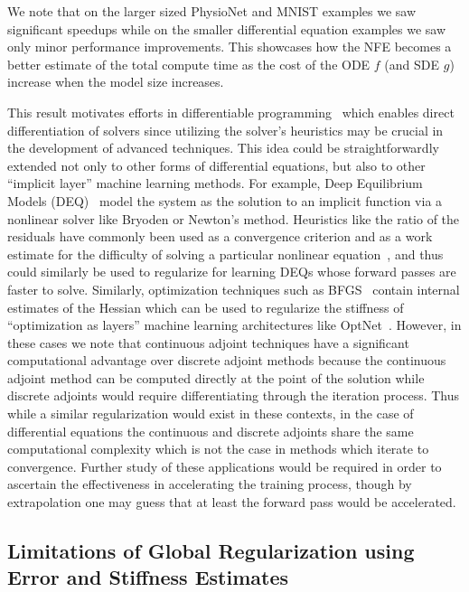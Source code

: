 We note that on the larger sized PhysioNet and MNIST examples we saw significant speedups while on the smaller differential equation examples we saw only minor performance improvements. This showcases how the NFE becomes a better estimate of the total compute time as the cost of the ODE $f$ (and SDE $g$) increase when the model size increases.

This result motivates efforts in differentiable programming~\citep{wang2018backpropagation, abadi2019simple, rackauckas2020generalized} which enables direct differentiation of solvers since utilizing the solver's heuristics may be crucial in the development of advanced techniques. This idea could be straightforwardly extended not only to other forms of differential equations, but also to other ``implicit layer'' machine learning methods. For example, Deep Equilibrium Models (DEQ)~\citep{bai_deep_2019} model the system as the solution to an implicit function via a nonlinear solver like Bryoden or Newton's method. Heuristics like the ratio of the residuals have commonly been used as a convergence criterion and as a work estimate for the difficulty of solving a particular nonlinear equation~\citep{wanner1996solving}, and thus could similarly be used to regularize for learning DEQs whose forward passes are faster to solve. Similarly, optimization techniques such as BFGS~\citep{kelley1999iterative} contain internal estimates of the Hessian which can be used to regularize the stiffness of ``optimization as layers'' machine learning architectures like OptNet~\citep{amos2017optnet}. However, in these cases we note that continuous adjoint techniques have a significant computational advantage over discrete adjoint methods because the continuous adjoint method can be computed directly at the point of the solution while discrete adjoints would require differentiating through the iteration process. Thus while a similar regularization would exist in these contexts, in the case of differential equations the continuous and discrete adjoints share the same computational complexity which is not the case in methods which iterate to convergence. Further study of these applications would be required in order to ascertain the effectiveness in accelerating the training process, though by extrapolation one may guess that at least the forward pass would be accelerated.

\subsection{Limitations of Global Regularization using Error and Stiffness Estimates}
\label{subsec:limitations_of_using_error_and_stiffness_estimates}

